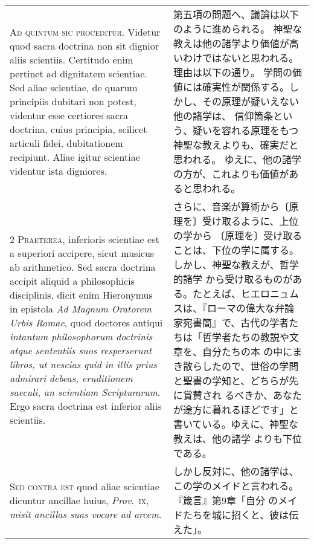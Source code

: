 \documentclass[10pt]{jsarticle} %
\begin{document}
\begin{longtable}{p{21em}p{21em}}

{\Huge A}{\scshape d quintum sic proceditur}. Videtur quod
sacra doctrina non sit dignior aliis scientiis. Certitudo enim pertinet
ad dignitatem scientiae. Sed aliae scientiae, de quarum principiis
dubitari non potest, videntur esse certiores sacra doctrina, cuius
principia, scilicet articuli fidei, dubitationem recipiunt. Aliae igitur
scientiae videntur ista digniores.


&

第五項の問題へ、議論は以下のように進められる。
神聖な教えは他の諸学より価値が高いわけではないと思われる。
理由は以下の通り。
学問の価値には確実性が関係する。しかし、その原理が疑いえない他の諸学は、
 信仰箇条という、疑いを容れる原理をもつ神聖な教えよりも、確実だと思われる。
ゆえに、他の諸学の方が、これよりも価値があると思われる。


\\


{\scshape 2 Praeterea}, inferioris scientiae est a
superiori accipere, sicut musicus ab arithmetico. Sed sacra doctrina
accipit aliquid a philosophicis disciplinis, dicit enim Hieronymus in
epistola {\itshape Ad Magnum Oratorem Urbis Romae}, quod doctores antiqui {\itshape intantum
philosophorum doctrinis atque sententiis suos resperserunt libros, ut
nescias quid in illis prius admirari debeas, eruditionem saeculi, an
scientiam Scripturarum}. Ergo sacra doctrina est inferior aliis
scientiis.


&

さらに、音楽が算術から〔原理を〕受け取るように、上位の学から
 〔原理を〕受け取ることは、下位の学に属する。しかし、神聖な教えが、哲学的諸学
 から受け取るものがある。たとえば、ヒエロニュムスは、『ローマの偉大な弁論
 家宛書簡』で、古代の学者たちは「哲学者たちの教説や文章を、自分たちの本
 の中にまき散らしたので、世俗の学問と聖書の学知と、どちらが先に賞賛され
 るべきか、あなたが途方に暮れるほどです」と書いている。ゆえに、神聖な教えは、他の諸学
 よりも下位である。



\\


{\scshape Sed contra est} quod aliae scientiae dicuntur
ancillae huius, {\itshape Prov}.~{\scshape ix}, {\itshape misit ancillas suas vocare ad arcem}.


&


しかし反対に、他の諸学は、この学のメイドと言われる。『箴言』第9章「自分
 のメイドたちを城に招くと、彼は伝えた」。


\end{longtable}
\end{document}
